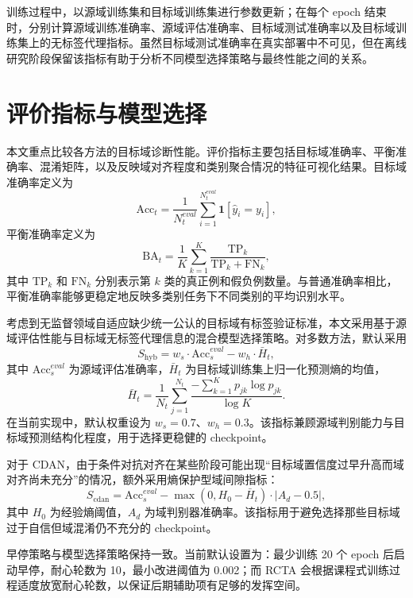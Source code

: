 训练过程中，以源域训练集和目标域训练集进行参数更新；在每个 epoch 结束时，分别计算源域训练准确率、源域评估准确率、目标域测试准确率以及目标域训练集上的无标签代理指标。虽然目标域测试准确率在真实部署中不可见，但在离线研究阶段保留该指标有助于分析不同模型选择策略与最终性能之间的关系。

\section{评价指标与模型选择}
本文重点比较各方法的目标域诊断性能。评价指标主要包括目标域准确率、平衡准确率、混淆矩阵，以及反映域对齐程度和类别聚合情况的特征可视化结果。目标域准确率定义为
\begin{equation}
\mathrm{Acc}_t=\frac{1}{N_t^{eval}}\sum_{i=1}^{N_t^{eval}}\mathbf{1}[\hat{y}_i=y_i],
\end{equation}
平衡准确率定义为
\begin{equation}
\mathrm{BA}_t=\frac{1}{K}\sum_{k=1}^{K}
\frac{\mathrm{TP}_k}{\mathrm{TP}_k+\mathrm{FN}_k},
\end{equation}
其中 $\mathrm{TP}_k$ 和 $\mathrm{FN}_k$ 分别表示第 $k$ 类的真正例和假负例数量。与普通准确率相比，平衡准确率能够更稳定地反映多类别任务下不同类别的平均识别水平。

考虑到无监督领域自适应缺少统一公认的目标域有标签验证标准，本文采用基于源域评估性能与目标域无标签代理信息的混合模型选择策略。对多数方法，默认采用
\begin{equation}
S_{\mathrm{hyb}}=
w_s\cdot \mathrm{Acc}_s^{eval}
-w_h\cdot \bar{H}_t,
\end{equation}
其中 $\mathrm{Acc}_s^{eval}$ 为源域评估准确率，$\bar{H}_t$ 为目标域训练集上归一化预测熵的均值，
\begin{equation}
\bar{H}_t=\frac{1}{N_t}\sum_{j=1}^{N_t}
\frac{-\sum_{k=1}^{K}p_{jk}\log p_{jk}}{\log K}.
\end{equation}
在当前实现中，默认权重设为 $w_s=0.7$、$w_h=0.3$。该指标兼顾源域判别能力与目标域预测结构化程度，用于选择更稳健的 checkpoint。

对于 CDAN，由于条件对抗对齐在某些阶段可能出现“目标域置信度过早升高而域对齐尚未充分”的情况，额外采用熵保护型域间隙指标：
\begin{equation}
S_{\mathrm{cdan}}=
\mathrm{Acc}_s^{eval}
-\max(0,H_0-\bar{H}_t)\cdot |A_d-0.5|,
\end{equation}
其中 $H_0$ 为经验熵阈值，$A_d$ 为域判别器准确率。该指标用于避免选择那些目标域过于自信但域混淆仍不充分的 checkpoint。

早停策略与模型选择策略保持一致。当前默认设置为：最少训练 20 个 epoch 后启动早停，耐心轮数为 10，最小改进阈值为 0.002；而 RCTA 会根据课程式训练过程适度放宽耐心轮数，以保证后期辅助项有足够的发挥空间。

